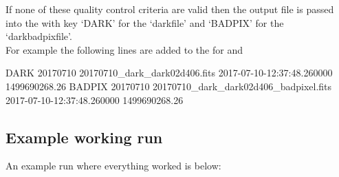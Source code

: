 \noindent If none of these quality control criteria are valid then the output file is passed into the \calibdb with key `DARK' for the `darkfile' and `BADPIX' for the `darkbadpixfile'. \\

\noindent For example the following lines are added to the \calibdb for 
 and  

\begin{textbox}[title={In calibration database file}]
DARK 20170710 20170710_dark_dark02d406.fits 2017-07-10-12:37:48.260000 1499690268.26
BADPIX 20170710 20170710_dark_dark02d406_badpixel.fits 2017-07-10-12:37:48.260000 1499690268.26
\end{textbox}

\newpage
\subsection{Example working run}

An example run where everything worked is below:

